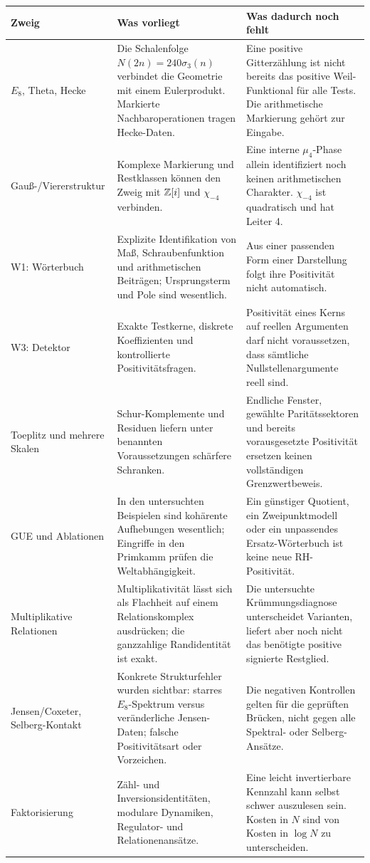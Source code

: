 \begin{longtable}{L{31mm}L{58mm}L{59mm}}
\toprule\textbf{Zweig}&\textbf{Was vorliegt}&\textbf{Was dadurch noch fehlt}\\\midrule\endhead
$E_8$, Theta, Hecke&Die Schalenfolge $N(2n)=240\sigma_3(n)$ verbindet die Geometrie mit einem Eulerprodukt. Markierte Nachbaroperationen tragen Hecke-Daten.&Eine positive Gitterzählung ist nicht bereits das positive Weil-Funktional für alle Tests. Die arithmetische Markierung gehört zur Eingabe.\\
Gauß-/Viererstruktur&Komplexe Markierung und Restklassen können den Zweig mit $\mathbb Z[i]$ und $\chi_{-4}$ verbinden.&Eine interne $\mu_4$-Phase allein identifiziert noch keinen arithmetischen Charakter. $\chi_{-4}$ ist quadratisch und hat Leiter 4.\\
W1: Wörterbuch&Explizite Identifikation von Maß, Schraubenfunktion und arithmetischen Beiträgen; Ursprungsterm und Pole sind wesentlich.&Aus einer passenden Form einer Darstellung folgt ihre Positivität nicht automatisch.\\
W3: Detektor&Exakte Testkerne, diskrete Koeffizienten und kontrollierte Positivitätsfragen.&Positivität eines Kerns auf reellen Argumenten darf nicht voraussetzen, dass sämtliche Nullstellenargumente reell sind.\\
Toeplitz und mehrere Skalen&Schur-Komplemente und Residuen liefern unter benannten Voraussetzungen schärfere Schranken.&Endliche Fenster, gewählte Paritätssektoren und bereits vorausgesetzte Positivität ersetzen keinen vollständigen Grenzwertbeweis.\\
GUE und Ablationen&In den untersuchten Beispielen sind kohärente Aufhebungen wesentlich; Eingriffe in den Primkamm prüfen die Weltabhängigkeit.&Ein günstiger Quotient, ein Zweipunktmodell oder ein unpassendes Ersatz-Wörterbuch ist keine neue RH-Positivität.\\
Multiplikative Relationen&Multiplikativität lässt sich als Flachheit auf einem Relationskomplex ausdrücken; die ganzzahlige Randidentität ist exakt.&Die untersuchte Krümmungsdiagnose unterscheidet Varianten, liefert aber noch nicht das benötigte positive signierte Restglied.\\
Jensen/Coxeter, Selberg-Kontakt&Konkrete Strukturfehler wurden sichtbar: starres $E_8$-Spektrum versus veränderliche Jensen-Daten; falsche Positivitätsart oder Vorzeichen.&Die negativen Kontrollen gelten für die geprüften Brücken, nicht gegen alle Spektral- oder Selberg-Ansätze.\\
Faktorisierung&Zähl- und Inversionsidentitäten, modulare Dynamiken, Regulator- und Relationenansätze.&Eine leicht invertierbare Kennzahl kann selbst schwer auszulesen sein. Kosten in $N$ sind von Kosten in $\log N$ zu unterscheiden.\\\bottomrule
\end{longtable}

